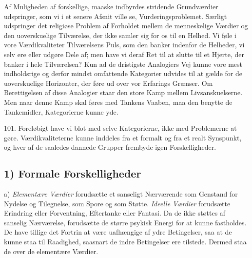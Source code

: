 \documentclass[12pt,a4paper]{book}
\newcommand{\apage}[1]{\marginnote{\footnotesize\textit{[#1]}}}
\begin{document}
Af Muligheden af forskellige, maaske indbyrdes stridende Grundværdier udspringer,
som vi i et senere Afsnit ville se, Vurderingsproblemet. Særligt udspringer det
religiøse Problem af Forholdet mellem de menneskelige Værdier og den uoverskuelige
Tilværelse, der ikke samler sig \apage{241}
for os til en Helhed. Vi føle i vore Værdikvaliteter Tilværelsens Puls, som den
banker indenfor de Helheder, vi selv ere eller udgøre Dele af; men have vi deraf
Ret til at slutte til et Hjerte, der banker i hele Tilværelsen? Kun ad de
dristigste Analogiers Vej kunne vore mest indholdsrige og derfor mindst
omfattende Kategorier udvides til at gælde for de uoverskuelige Horizonter, der
føre ud over vor Erfarings Grænser. Om Berettigelsen af disse Analogier staar den
store Kamp mellem Livsanskuelserne. Men naar denne Kamp skal føres med Tankens
Vaaben, maa den benytte de Tankemidler, Kategorierne kunne yde.

101. Foreløbigt have vi blot med selve Kategorierne, ikke med Problemerne at gøre.
Værdikvaliteterne kunne inddeles fra et formalt og fra et realt Synspunkt, og hver
af de saaledes dannede Grupper frembyde igen Forskelligheder.

\subsection*{1) Formale Forskelligheder}

a) \emph{Elementære Værdier} forudsætte et sanseligt Nærværende som Genstand for
Nydelse og Tilegnelse, som Spore og som Støtte. \emph{Ideelle Værdier} forudsætte
Erindring eller Forventning, Eftertanke eller Fantasi. Da de ikke støttes af
sanselig Nærværelse, forudsætte de større psykisk Energi for at kunne fastholdes.
De have tillige det Fortrin at være uafhængige af ydre Betingelser, saa at de
kunne staa til Raadighed, saasnart de indre Betingelser ere tilstede. Dermed staa
de over de elementære Værdier.
\end{document}
